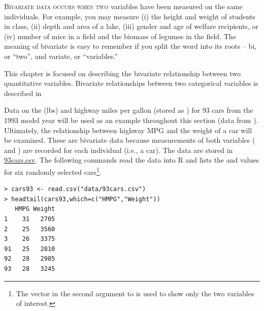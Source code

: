 \documentclass[10pt,openany]{book}\usepackage[]{graphicx}\usepackage[]{color}
\makeatletter
\newenvironment{kframe}{%
 \def\at@end@of@kframe{}%
 \ifinner\ifhmode%
  \def\at@end@of@kframe{\end{minipage}}%
  \begin{minipage}{\columnwidth}%
 \fi\fi%
 \def\FrameCommand##1{\hskip\@totalleftmargin \hskip-\fboxsep
 \colorbox{shadecolor}{##1}\hskip-\fboxsep
     \hskip-\linewidth \hskip-\@totalleftmargin \hskip\columnwidth}%
 \MakeFramed {\advance\hsize-\width
   \@totalleftmargin\z@ \linewidth\hsize
   \@setminipage}}%
 {\par\unskip\endMakeFramed%
 \at@end@of@kframe}
\newenvironment{knitrout}{}{} %
\makeatother
\begin{document}
\minitoc
\newpage

\lettrine{B}{ivariate data occurs when two} variables have been measured on the same individuals.  For example, you may measure (i) the height and weight of students in class, (ii) depth and area of a lake, (iii) gender and age of welfare recipients, or (iv) number of mice in a field and the biomass of legumes in the field.  The meaning of bivariate is easy to remember if you split the word into its roots -- bi, or ``two'', and variate, or ``variables.''


This chapter is focused on describing the bivariate relationship between two quantitative variables. Bivariate relationships between two categorical variables is described in 

Data on the  (lbs) and highway miles per gallon (stored as ) for 93 cars from the 1993 model year will be used as an example throughout this section (data from \cite{Lock1993}).  Ultimately, the relationship between highway MPG and the weight of a car will be examined.  These are bivariate data because measurements of both variables ( and ) are recorded for each individual (i.e., a car).  The data are stored in \href{https://raw.githubusercontent.com/droglenc/NCData/master/93cars.csv}{93cars.csv}.  The following commands read the data into R and lists the  and  values for six randomly selected cars\footnote{The vector in the second argument to  is used to show only the two variables of interest.}.
\begin{knitrout}
\color{fgcolor}\begin{kframe}
\begin{verbatim}
> cars93 <- read.csv("data/93cars.csv")
> headtail(cars93,which=c("HMPG","Weight"))
   HMPG Weight
1    31   2705
2    25   3560
3    26   3375
91   25   2810
92   28   2985
93   28   3245
\end{verbatim}
\end{kframe}
\end{knitrout}
\end{document}
